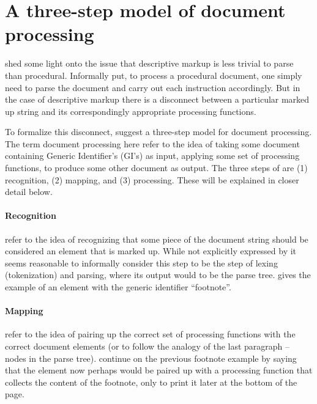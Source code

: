\documentclass{scrreprt}
\begin{document}
%
%
%
%
%
%

\section{A three-step model of document processing}
\label{sec:three-step-model}
\citet{goldfarb} shed some light onto the issue that descriptive markup is less trivial to parse than procedural. Informally put, to process a procedural document, one simply need to parse the document and carry out each instruction accordingly. But in the case of descriptive markup there is a disconnect between a particular marked up string and its correspondingly appropriate processing functions.

To formalize this disconnect, \citet{goldfarb} suggest a three-step model for document processing. The term document processing here refer to the idea of taking some document containing Generic Identifier's (GI's) as input, applying some set of processing functions, to produce some other document as output. The three steps of \citet{goldfarb} are (1) recognition, (2) mapping, and (3) processing. These will be explained in closer detail below.

\paragraph{Recognition} refer to the idea of recognizing that some piece of the document string should be considered an element that is marked up. While not explicitly expressed by \citet{goldfarb} it seems reasonable to informally consider this step to be the step of lexing (tokenization) and parsing, where its output would to be the parse tree. \citet{goldfarb} gives the example of an element with the generic identifier ``footnote''.

\paragraph{Mapping} refer to the idea of pairing up the correct set of processing functions with the correct document elements (or to follow the analogy of the last paragraph -- nodes in the parse tree). \citet{goldfarb} continue on the previous footnote example by saying that the element now perhaps would be paired up with a processing function that collects the content of the footnote, only to print it later at the bottom of the page.
\end{document}
